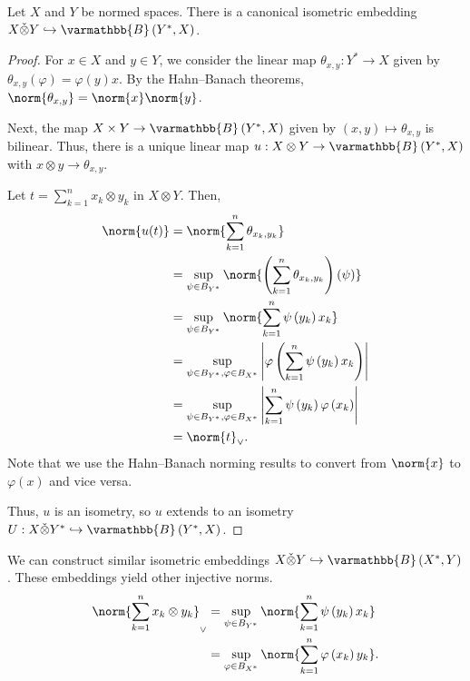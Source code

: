 \documentclass[10pt]{mypackage}
\renewcommand*{\mathbb}[1]{\varmathbb{#1}}
\newcommand{\B}{\mathbb{B}}
\begin{document}
\begin{proposition}
  Let $X$ and $Y$ be normed spaces. There is a canonical isometric embedding $X\check\otimes Y \hookrightarrow \B\left(Y^{\ast},X\right)$.
\end{proposition}
\begin{proof}
  For $x\in X$ and $y\in Y$, we consider the linear map $\theta_{x,y}: Y^{\ast}\rightarrow X$ given by $\theta_{x,y}\left(\varphi\right) = \varphi(y)x$. By the Hahn--Banach theorems, $\norm{\theta_{x,y}} = \norm{x}\norm{y}$.\newline

  Next, the map $X\times Y\rightarrow \B\left(Y^{\ast},X\right)$ given by $\left(x,y\right)\mapsto \theta_{x,y}$ is bilinear. Thus, there is a unique linear map $u: X\otimes Y \rightarrow \B\left(Y^{\ast},X\right)$ with $x\otimes y \rightarrow \theta_{x,y}$.\newline

  Let $t = \sum_{k=1}^{n}x_k\otimes y_k$ in $X\otimes Y$. Then,
  \begin{align*}
    \norm{u(t)} &= \norm{\sum_{k=1}^{n}\theta_{x_k,y_k}}\\
                &= \sup_{\psi\in B_{Y^{\ast}}}\norm{\left(\sum_{k=1}^{n}\theta_{x_k,y_k}\right)\left(\psi\right)}\\
                &= \sup_{\psi\in B_{Y^{\ast}}}\norm{\sum_{k=1}^{n}\psi\left(y_k\right)x_k}\\
                &= \sup_{\psi\in B_{Y^{\ast}},\varphi\in B_{X^{\ast}}}\left\vert \varphi\left(\sum_{k=1}^{n}\psi\left(y_k\right)x_k\right) \right\vert\\
                &= \sup_{\psi\in B_{Y^{\ast}},\varphi\in B_{X^{\ast}}}\left\vert \sum_{k=1}^{n}\psi\left(y_k\right)\varphi\left(x_k\right) \right\vert\\
                &= \norm{t}_{\vee}.
  \end{align*}
  Note that we use the Hahn--Banach norming results to convert from $\norm{x}$ to $\varphi(x)$ and vice versa.\newline

  Thus, $u$ is an isometry, so $u$ extends to an isometry $U: X\check\otimes Y^{\ast}\hookrightarrow \B\left(Y^{\ast},X\right)$.
\end{proof}
\begin{remark}
  We can construct similar isometric embeddings $X\check\otimes Y\hookrightarrow \B\left(X^{\ast},Y\right)$. These embeddings yield other injective norms.
  \begin{align*}
    \norm{\sum_{k=1}^{n}x_k\otimes y_k}_{\vee} &= \sup_{\psi\in B_{Y^{\ast}}}\norm{\sum_{k=1}^{n}\psi\left(y_k\right)x_k}\\
                                               &= \sup_{\varphi\in B_{X^{\ast}}}\norm{\sum_{k=1}^{n}\varphi\left(x_k\right)y_k}.
  \end{align*}
\end{remark}
\end{document}
